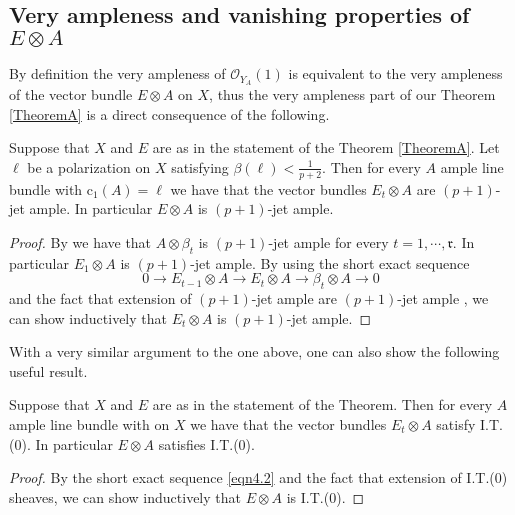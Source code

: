 \documentclass[11pt,letter]{amsart}
\numberwithin{equation}{section}
\begin{document}
\subsection{Very ampleness and vanishing properties of $E\otimes A$}
By definition the very ampleness of $\mathcal{O}_{Y_A}(1)$ is equivalent to the very ampleness of the vector bundle $E\otimes A$ on $X$, thus the very ampleness part of our Theorem \ref{TheoremA} is a direct consequence of the following.
\begin{lemma}\label{lem:kample}
    Suppose that $X$ and $E$ are as in the statement of the Theorem \ref{TheoremA}. Let $\ell$ be a polarization on $X$ satisfying $\beta(\ell)<\frac{1}{p+2}$. Then for every $A$ ample line bundle with $\mathrm{c}_1(A)=\ell$ we have that the vector bundles $E_t\otimes A$ are $(p+1)$-jet ample. In particular $E\otimes A$ is $(p+1)$-jet ample.
\end{lemma}
\begin{proof}
    By \cite[Theorem D]{Caucci} we have that $A\otimes \beta_t$ is $(p+1)$-jet ample for every $t=1,\cdots, \mathfrak{r}$. In particular $E_1\otimes A$ is $(p+1)$-jet ample. By using the short exact sequence
    \begin{equation}\label{eqn4.2}
    0\rightarrow E_{t-1}\otimes A\longrightarrow E_t\otimes A\longrightarrow \beta_t\otimes A\rightarrow 0
    \end{equation}
    and the fact that extension of $(p+1)$-jet ample are $(p+1)$-jet ample \cite[Proposition 2.6]{BDS}, we can show inductively that $E_t\otimes A$ is $(p+1)$-jet ample.
\end{proof}
With a very similar argument to the one above, one can also show the following useful result.
\begin{lemma}\label{lem:EAIT0}
    Suppose that $X$ and $E$ are as in the statement of the Theorem. Then for every $A$ ample line bundle with on $X$ we have that the vector bundles $E_t\otimes A$ satisfy I.T.(0). In particular $E\otimes A$ satisfies I.T.(0).
\end{lemma}
\begin{proof}
By the short exact sequence \eqref{eqn4.2} and the fact that extension of I.T.(0) sheaves, we can show inductively that $E\otimes A$ is I.T.(0).
\end{proof}
\end{document}
